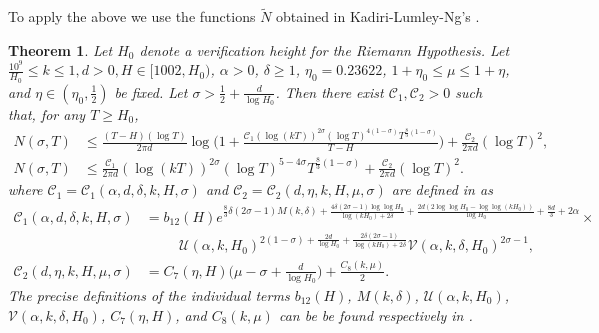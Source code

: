 \documentclass[10pt]{amsart}
\newcommand{\s}{\sigma}
\newtheorem{thm}[prop]{Theorem}
\theoremstyle{definition}
\numberwithin{equation}{section}
\begin{document}
%
To apply the above we use the functions $\tilde{N} $ %
obtained in Kadiri-Lumley-Ng's \cite[Theorem 1.1]{KLN18}. 
\begin{thm}  \label{ZD-KLN}
Let $H_0$ denote a verification height for the Riemann Hypothesis.
Let  $\frac{10^9}{H_0} \le k \le 1,d>0, H\in [1002,H_0)$, $\alpha>0$, $\delta\ge1$, $\eta_0=0.23622$, $1+\eta_0\le \mu \le 1+\eta$, 
and $\eta\in(\eta_0,\frac{1}{2})$ be fixed. Let $\sigma > \frac12 +\frac{d}{\log H_0}$. 
Then there exist $\mathcal{C}_1 ,\mathcal{C}_2 >0$ such that, for any $T\ge H_0$,
\begin{align} 
N(\s,T)
& \le \frac{(T-H)(\log T)}{2\pi d}
\log
\Big( 1 
+\frac{  \mathcal{C}_1
(\log (kT))^{2\s}  (\log T)^{4(1-\s)} T^{\frac83(1-\s)}
 }{T-H}  \Big)
+ \frac{ \mathcal{C}_2  }{2\pi d} (\log T)^2 ,
\\
\label{KLN-NsigT1}
N(\s,T)
& \le 
 \frac{ \mathcal{C}_1}{2\pi d}
(\log (kT))^{2\s}  (\log T)^{5-4\s } T^{\frac83(1-\s)}
+ \frac{ \mathcal{C}_2  }{2\pi d} (\log T)^2.
\end{align}
where $\mathcal{C}_1= \mathcal{C}_1(\alpha, d,\delta, k, H, \s)$ and $\mathcal{C}_2=\mathcal{C}_2 (d, \eta, k, H, \mu,\s)$ are defined in  \cite[Lemma 4.14]{KLN18} as
\begin{align}
\label{eqn-C1}
 \mathcal{C}_1(\alpha, d,\delta, k, H, \s) &=  b_{12}(H)e^{\frac{8}{3}\delta(2\s-1)M(k,\delta)+\frac{4\delta(2\s-1)\log\log H_0}{\log(k H_0) + 2\delta }  + \frac{2d(2\log\log H_0 - \log\log (kH_0))}{\log H_0} + \frac{8d}{3} + 2\alpha } \times
                                      \\&\nonumber  \ \qquad\  \mathcal{U}(\alpha,k,H_0)^{2(1-\sigma) + \frac{2d}{\log H_0} + \frac{2\delta(2\sigma-1)}{\log( kH_0) + 2\delta}} 
                                        \mathcal{V}(\alpha,k,\delta,H_0)^{2\sigma-1} ,
\\
\label{eqn-C2} 
 \mathcal{C}_2 (d, \eta, k, H, \mu,\s) & = C_7(\eta,H)\Big(\mu - \sigma + \frac{d}{\log H_0}\Big) + \frac{C_8(k,\mu)}2 .
 \end{align}
The precise definitions of the individual terms $b_{12}(H)$, $M(k,\delta)$, $\mathcal{U}(\alpha,k,H_0)$, $\mathcal{V}(\alpha,k,\delta,H_0)$, $C_7(\eta,H)$, and $C_8(k,\mu)$ can be be found respectively in  \cite[(4.18), (4.19), (4.23), (4.56), (4.63), and (4.75)]{KLN18}.
\end{thm}
\end{document}

